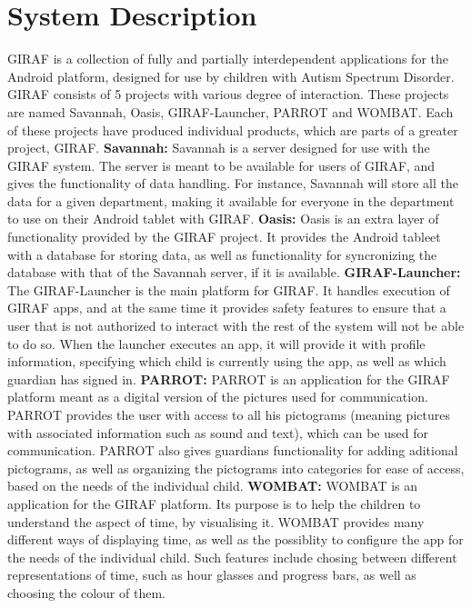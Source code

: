 \section{System Description}
GIRAF is a collection of fully and partially interdependent applications for the Android platform, designed for use by children with Autism Spectrum Disorder.\newline
GIRAF consists of 5 projects with various degree of interaction. These projects are named Savannah, Oasis, GIRAF-Launcher, PARROT and WOMBAT. Each of these projects have produced individual products, which are parts of a greater project, GIRAF.\newline
\textbf{Savannah:} Savannah is a server designed for use with the GIRAF system. The server is meant to be available for users of GIRAF, and gives the functionality of data handling. For instance, Savannah will store all the data for a given department, making it available for everyone in the department to use on their Android tablet with GIRAF.\newline
\textbf{Oasis:} Oasis is an extra layer of functionality provided by the GIRAF project. It provides the Android tableet with a database for storing data, as well as functionality for syncronizing the database with that of the Savannah server, if it is available.\newline
\textbf{GIRAF-Launcher:} The GIRAF-Launcher is the main platform for GIRAF. It handles execution of GIRAF apps, and at the same time it provides safety features to ensure that a user that is not authorized to interact with the rest of the system will not be able to do so. When the launcher executes an app, it will provide it with profile information, specifying which child is currently using the app, as well as which guardian has signed in.\newline
\textbf{PARROT:} PARROT is an application for the GIRAF platform meant as a digital version of the pictures used for communication. PARROT provides the user with access to all his pictograms (meaning pictures with associated information such as sound and text), which can be used for communication. PARROT also gives guardians functionality for adding aditional pictograms, as well as organizing the pictograms into categories for ease of access, based on the needs of the individual child.\newline
\textbf{WOMBAT:} WOMBAT is an application for the GIRAF platform. Its purpose is to help the children to understand the aspect of time, by visualising it. WOMBAT provides many different ways of displaying time, as well as the possiblity to configure the app for the needs of the individual child. Such features include chosing between different representations of time, such as hour glasses and progress bars, as well as choosing the colour of them.\newline